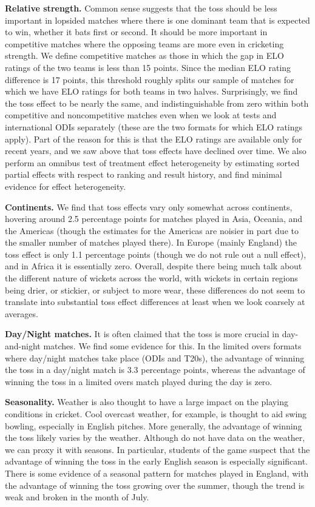 \documentclass[11pt,  letterpaper]{article}
\begin{document}
\textbf{Relative strength.} Common sense suggests that the toss should be less important in lopsided matches where there is one dominant team that is expected to win, whether it bats first or second. It should be more important in competitive matches where the opposing teams are more even in cricketing strength. We define competitive matches as those in which the gap in ELO ratings of the two teams is less than 15 points. Since the median ELO rating difference is 17 points, this threshold roughly splits our sample of matches for which we have ELO ratings for both teams in two halves. Surprisingly, we find the toss effect to be nearly the same, and indistinguishable from zero within both competitive and noncompetitive matches even when we look at tests and international ODIs separately (these are the two formats for which ELO ratings apply). Part of the reason for this is that the ELO ratings are available only for recent years, and we saw above that toss effects have declined over time. We also perform an omnibus test of treatment effect heterogeneity by estimating sorted partial effects \citep{chernozhukov2018sorted,chen2019sortedeffects} with respect to ranking and result history, and find minimal evidence for effect heterogeneity. 

\textbf{Continents.} We find that toss effects vary only somewhat across continents, hovering around 2.5 percentage points for matches played in Asia, Oceania, and the Americas (though the estimates for the Americas are noisier in part due to the smaller number of matches played there). In Europe (mainly England) the toss effect is only 1.1 percentage points (though we do not rule out a null effect), and in Africa it is essentially zero. Overall, despite there being much talk about the different nature of wickets across the world, with wickets in certain regions being drier, or stickier, or subject to more wear, these differences do not seem to translate into substantial toss effect differences at least when we look coarsely at averages.

\textbf{Day/Night matches.} It is often claimed that the toss is more crucial in day-and-night matches. We find some evidence for this. In the limited overs formats where day/night matches take place (ODIs and T20s), the advantage of winning the toss in a day/night match is 3.3 percentage points, whereas the
advantage of winning the toss in a limited overs match played during the day is zero. 

\textbf{Seasonality.} Weather is also thought to have a large impact on the playing conditions in cricket. Cool
overcast weather, for example, is thought to aid swing bowling, especially in English pitches. More generally,
the advantage of winning the toss likely varies by the weather. Although do not have data on
the weather, we can proxy it with seasons. In particular, students of the game suspect that
the advantage of winning the toss in the early English season is especially significant.
There is some evidence of a seasonal pattern for matches played in England, with the advantage of winning the toss
growing over the summer, though the trend is weak and broken in the month of July.
\end{document}
